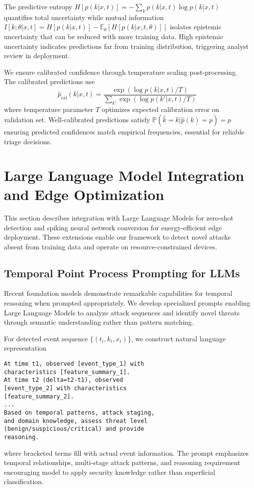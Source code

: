 \documentclass[10pt,journal,compsoc]{IEEEtran}
\begin{document}
The predictive entropy $H[p(k | x, t)] = -\sum_k p(k | x, t) \log p(k | x, t)$ quantifies total uncertainty while mutual information $I[k; \theta | x, t] = H[p(k | x, t)] - \mathbb{E}_\theta[H[p(k | x, t, \theta)]]$ isolates epistemic uncertainty that can be reduced with more training data. High epistemic uncertainty indicates predictions far from training distribution, triggering analyst review in deployment.

We ensure calibrated confidence through temperature scaling post-processing. The calibrated predictions use
\begin{equation}
\hat{p}_{\text{cal}}(k | x, t) = \frac{\exp(\log p(k | x, t) / T)}{\sum_{k'} \exp(\log p(k' | x, t) / T)}
\end{equation}
where temperature parameter $T$ optimizes expected calibration error on validation set. Well-calibrated predictions satisfy $\mathbb{P}(\hat{k} = k | \hat{p}(k) = p) = p$ ensuring predicted confidences match empirical frequencies, essential for reliable triage decisions.

\section{Large Language Model Integration and Edge Optimization}
\label{sec:llm_edge}

This section describes integration with Large Language Models for zero-shot detection and spiking neural network conversion for energy-efficient edge deployment. These extensions enable our framework to detect novel attacks absent from training data and operate on resource-constrained devices.

\subsection{Temporal Point Process Prompting for LLMs}

Recent foundation models demonstrate remarkable capabilities for temporal reasoning when prompted appropriately. We develop specialized prompts enabling Large Language Models to analyze attack sequences and identify novel threats through semantic understanding rather than pattern matching.

For detected event sequence $\{(t_i, k_i, x_i)\}$, we construct natural language representation
\begin{verbatim}
At time t1, observed [event_type_1] with 
characteristics [feature_summary_1].
At time t2 (delta=t2-t1), observed 
[event_type_2] with characteristics 
[feature_summary_2].
...
Based on temporal patterns, attack staging, 
and domain knowledge, assess threat level 
(benign/suspicious/critical) and provide 
reasoning.
\end{verbatim}
where bracketed terms fill with actual event information. The prompt emphasizes temporal relationships, multi-stage attack patterns, and reasoning requirement encouraging model to apply security knowledge rather than superficial classification.
\end{document}

